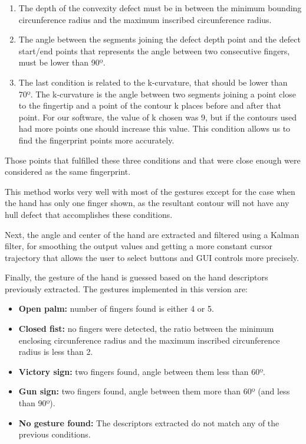 \begin{enumerate}
\item The depth of the convexity defect must be in between the minimum bounding circunference radius and the maximum inscribed circunference radius. 
\item The angle between the segments joining the defect depth point and the defect start/end points that represents the angle between two consecutive fingers, must be lower than 90º.
\item The last condition is related to the k-curvature, that should be lower than 70º. The k-curvature is the angle between two segments joining a point close to the fingertip and a point of the contour k places before and after that point. For our software, the value of k chosen was 9, but if the contours used had more points one should increase this value. This condition allows us to find the fingerprint points more accurately.
\end{enumerate}

Those points that fulfilled these three conditions and that were close enough were considered as the same fingerprint.

This method works very well with most of the gestures except for the case when the hand has only one finger shown, as the resultant contour will not have any hull defect that accomplishes these conditions.

Next, the angle and center of the hand are extracted and filtered using a Kalman filter, for smoothing the output values and getting a more constant cursor trajectory that allows the user to select buttons and GUI controls more precisely.

Finally, the gesture of the hand is guessed based on the hand descriptors previously extracted. The gestures implemented in this version are:

\begin{itemize}
\item {\bfseries Open palm:} number of fingers found is either 4 or 5.
\item {\bfseries Closed fist:} no fingers were detected, the ratio between the minimum enclosing circunference radius and the maximum inscribed circunference radius is less than 2.
\item {\bfseries Victory sign:} two fingers found, angle between them less than 60º.
\item {\bfseries Gun sign:} two fingers found, angle between them more than 60º (and less than 90º).
\item {\bfseries No gesture found:} The descriptors extracted do not match any of the previous conditions.
\end{itemize}

